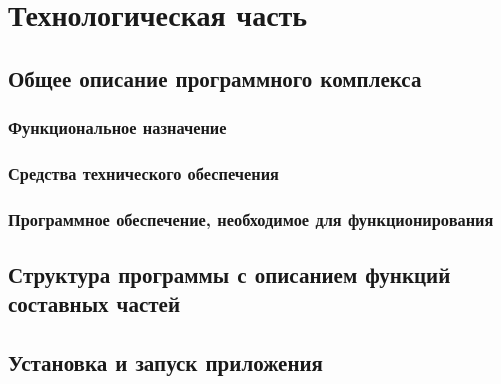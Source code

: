 \section{Технологическая часть}

\subsection{Общее описание программного комплекса}
\subsubsection{Функциональное назначение}
\subsubsection{Средства технического обеспечения}
\subsubsection{Программное обеспечение, необходимое для функционирования}

\subsection{Структура программы с описанием функций составных частей}

\subsection{Установка и запуск приложения}